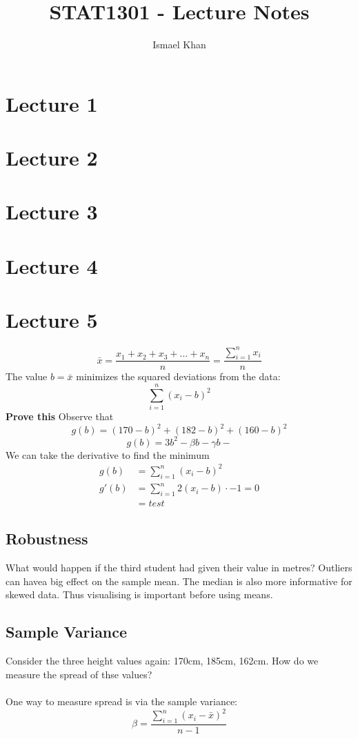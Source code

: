\documentclass{article}
\title{STAT1301 - Lecture Notes}
\author{Ismael Khan}
\date{}
\theoremstyle{definition}
\theoremstyle{plain}
\theoremstyle{remark}
\begin{document}
\maketitle
\noindent
\section{Lecture 1}
\section{Lecture 2}
\section{Lecture 3}
\section{Lecture 4}
\section{Lecture 5}
$$ \bar{x} = \frac{x_1 + x_2 + x_3 + ... + x_n}{n} = \frac{\displaystyle \sum_{i=1}^n x_i}{n} $$
The value $ b = \bar{x} $ minimizes the squared deviations from the data:
$$ \sum_{i=1}^n (x_i - b)^2 $$
\textbf{Prove this}
Observe that 
$$ g(b) = (170 - b)^2 + (182 - b)^2 + (160 - b)^2 $$
$$ g(b) = 3b^2 - \beta b - \gamma b -  $$
We can take the derivative to find the minimum
\begin{align*}
	g(b) &= \sum_{i=1}^n (x_i - b)^2\\
	g'(b) &= \sum_{i=1}^n 2(x_i -b) \cdot -1 = 0\\
	      &= test
\end{align*}

\subsection{Robustness}
What would happen if the third student had given their value in metres? Outliers can havea  big effect on the sample mean. The median is also more informative for skewed data. Thus visualising is important before using means.

\subsection{Sample Variance}
Consider the three height values again: 170cm, 185cm, 162cm. How do we measure the spread of thse values?\\\\
One way to measure spread is via the sample variance:
$$ \beta = \frac{\sum_{i=1}^n (x_i - \bar{x})^2}{n-1} $$
\end{document}
